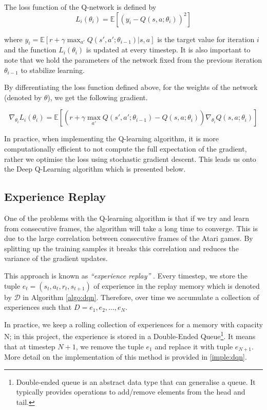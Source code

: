 \begin{defn}
	The loss function of the Q-network is defined by
	\[
		L_i(\theta_i) = \mathbb{E}\left[(y_i - Q(s, a; \theta_i))^2\right]
	\]
\end{defn}
where $y_i = \mathbb{E}\left[r + \gamma \max_{a'}Q(s', a'; \theta_{i - 1})\vert s, a\right]$ is the target value for iteration $i$ and the function $L_i(\theta_i)$ is updated at every timestep. It is also important to note that we hold the parameters of the network fixed from the previous iteration $\theta_{i - 1}$ to stabilize learning.

By differentiating the loss function defined above, for the weights of the network (denoted by $\theta$), we get the following gradient.

\begin{defn}
	\[
		\nabla_{\theta_i} L_i(\theta_i) = \mathbb{E} \left[ \left( r + \gamma \max_{a'} Q(s', a'; \theta_{i - 1}) - Q(s, a; \theta_i)\right) \nabla_{\theta_i} Q(s, a; \theta_i) \right]
	\]
\end{defn}

In practice, when implementing the Q-learning algorithm, it is more computationally efficient to not compute the full expectation of the gradient, rather we optimise the loss using stochastic gradient descent. This leads us onto the Deep Q-Learning algorithm which is presented below.



\subsection{Experience Replay}
\label{dsgn:subsec:exp-replay}

One of the problems with the Q-learning algorithm is that if we try and learn from consecutive frames, the algorithm will take a long time to converge. This is due to the large correlation between consecutive frames of the Atari games. By splitting up the training samples it breaks this correlation and reduces the variance of the gradient updates.

This approach is known as \textit{``experience replay''} \cite{Lin1992ReinforcementLF}. Every timestep, we store the tuple $e_t = (s_t, a_t, r_t, s_{t+1})$ of experience in the replay memory which is denoted by $\mathcal{D}$ in Algorithm \ref{algo:dqn}. Therefore, over time we accumulate a collection of experiences such that $D = e_1, e_2, \hdots, e_N$.

In practice, we keep a rolling collection of experiences for a memory with capacity N; in this project, the experience is stored in a Double-Ended Queue\footnote{Double-ended queue is an abstract data type that can generalise a queue. It typically provides operations to add/remove elements from the head and tail.}. It means that at timestep $N+1$, we remove the tuple $e_1$ and replace it with tuple $e_{N+1}$. More detail on the implementation of this method is provided in \ref{imple:dqn}.

